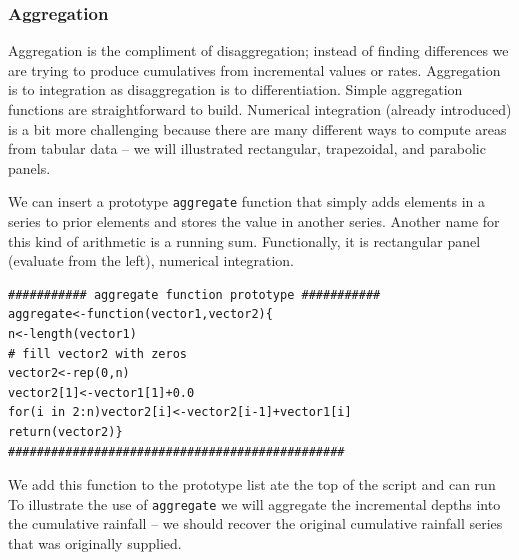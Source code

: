 \subsubsection{Aggregation}
Aggregation is the compliment of disaggregation; instead of finding differences we are trying to produce cumulatives from incremental values or rates.  Aggregation is to integration as disaggregation is to differentiation.  Simple aggregation functions are straightforward to build.  Numerical integration (already introduced) is a bit more challenging because there are many different ways to compute areas from tabular data -- we will illustrated rectangular, trapezoidal, and parabolic panels.  

We can insert a prototype \texttt{aggregate} function that simply adds elements in a series to prior elements and stores the value in another series.  Another name for this kind of arithmetic is a running sum.   Functionally, it is rectangular panel (evaluate from the left), numerical integration.
 
\begin{lstlisting}[caption=R code demonstrating the prototype function \texttt{aggregate()} , label=lst:aggregate]
########### aggregate function prototype ###########
aggregate<-function(vector1,vector2){
n<-length(vector1)
# fill vector2 with zeros
vector2<-rep(0,n)
vector2[1]<-vector1[1]+0.0
for(i in 2:n)vector2[i]<-vector2[i-1]+vector1[i]
return(vector2)}
###############################################
\end{lstlisting}

We add this function to the prototype list ate the top of the script and can run
To illustrate the use of \texttt{aggregate} we will aggregate the incremental depths into the cumulative rainfall -- we should recover the original cumulative rainfall series that was originally supplied.

